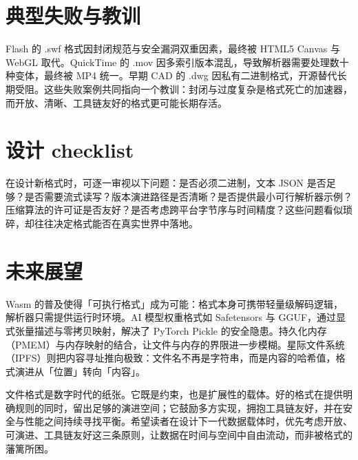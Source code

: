 \chapter{典型失败与教训}
Flash 的 .swf 格式因封闭规范与安全漏洞双重因素，最终被 HTML5 Canvas 与 WebGL 取代。QuickTime 的 .mov 因多索引版本混乱，导致解析器需要处理数十种变体，最终被 MP4 统一。早期 CAD 的 .dwg 因私有二进制格式，开源替代长期受阻。这些失败案例共同指向一个教训：封闭与过度复杂是格式死亡的加速器，而开放、清晰、工具链友好的格式更可能长期存活。\par
\chapter{设计 checklist}
在设计新格式时，可逐一审视以下问题：是否必须二进制，文本 JSON 是否足够？是否需要流式读写？版本演进路径是否清晰？是否提供最小可行解析器示例？压缩算法的许可证是否友好？是否考虑跨平台字节序与时间精度？这些问题看似琐碎，却往往决定格式能否在真实世界中落地。\par
\chapter{未来展望}
Wasm 的普及使得「可执行格式」成为可能：格式本身可携带轻量级解码逻辑，解析器只需提供运行时环境。AI 模型权重格式如 Safetensors 与 GGUF，通过显式张量描述与零拷贝映射，解决了 PyTorch Pickle 的安全隐患。持久化内存（PMEM）与内存映射的结合，让文件与内存的界限进一步模糊。星际文件系统（IPFS）则把内容寻址推向极致：文件名不再是字符串，而是内容的哈希值，格式演进从「位置」转向「内容」。\par
文件格式是数字时代的纸张。它既是约束，也是扩展性的载体。好的格式在提供明确规则的同时，留出足够的演进空间；它鼓励多方实现，拥抱工具链友好，并在安全与性能之间持续寻找平衡。希望读者在设计下一代数据载体时，优先考虑开放、可演进、工具链友好这三条原则，让数据在时间与空间中自由流动，而非被格式的藩篱所困。\par
